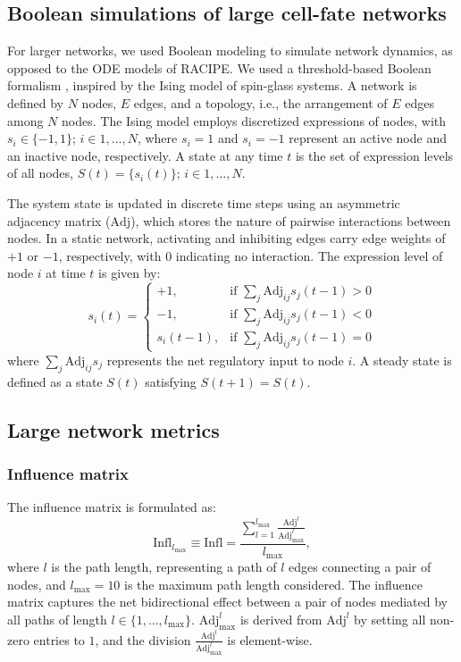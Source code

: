 \documentclass[11pt]{article}
\newcommand{\inm}{\mathrm{Infl}}
\newcommand{\adj}{\mathrm{Adj}}
\begin{document}
\subsection{Boolean simulations of large cell-fate networks}

For larger networks, we used Boolean modeling to simulate network dynamics, as opposed to the ODE models of RACIPE. We used a threshold-based Boolean formalism \cite{FontClos2018}, inspired by the Ising model of spin-glass systems. A network is defined by $N$ nodes, $E$ edges, and a topology, i.e., the arrangement of $E$ edges among $N$ nodes. The Ising model employs discretized expressions of nodes, with $s_i \in \{-1, 1\}$; $i \in 1, \ldots, N$, where $s_i = 1$ and $s_i = -1$ represent an active node and an inactive node, respectively. A state at any time $t$ is the set of expression levels of all nodes, $S(t) = \{s_i(t)\}$; $i \in 1, \ldots, N$.

The system state is updated in discrete time steps using an asymmetric adjacency matrix ($\adj$), which stores the nature of pairwise interactions between nodes. In a static network, activating and inhibiting edges carry edge weights of $+1$ or $-1$, respectively, with $0$ indicating no interaction. The expression level of node $i$ at time $t$ is given by:
\begin{equation} \label{eq:bool}
    s_i(t) = 
\begin{cases}
    +1, & \text{if } \sum_j \adj_{ij} s_j(t-1) > 0 \\
    -1, & \text{if } \sum_j \adj_{ij} s_j(t-1) < 0 \\
    s_i(t-1), & \text{if } \sum_j \adj_{ij} s_j(t-1) = 0
\end{cases}
\end{equation}
where $\sum_j \adj_{ij} s_j$ represents the net regulatory input to node $i$. A steady state is defined as a state $S(t)$ satisfying $S(t+1) = S(t)$.

\subsection{Large network metrics}

\subsubsection{Influence matrix}
The influence matrix is formulated as:
\begin{equation}
    \inm_{l_\mathrm{max}} \equiv \inm = \frac{\sum_{l=1}^{l_\mathrm{max}} \frac{\adj^l}{\adj_{\mathrm{max}}^l}}{l_\mathrm{max}},
\end{equation}
where $l$ is the path length, representing a path of $l$ edges connecting a pair of nodes, and $l_\mathrm{max} = 10$ is the maximum path length considered. The influence matrix captures the net bidirectional effect between a pair of nodes mediated by all paths of length $l \in \{1, \ldots, l_\mathrm{max}\}$. $\adj_{\mathrm{max}}^l$ is derived from $\adj^l$ by setting all non-zero entries to $1$, and the division $\frac{\adj^l}{\adj_{\mathrm{max}}^l}$ is element-wise.
\end{document}
